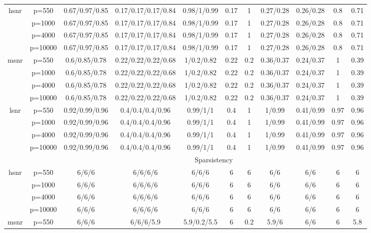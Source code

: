 \begin{table}[ht]
{\begin{tabular}{|c|c|ccccccccc|}
\midrule\multirow{4}[2]{*}{hsnr} & p=550 & 0.67/0.97/0.85 & 0.17/0.17/0.17/0.84 & 0.98/1/0.99 & 0.17 & 1 & 0.27/0.28 & 0.26/0.28 & 0.8 & 0.71 \\ 
   & p=1000 & 0.67/0.97/0.85 & 0.17/0.17/0.17/0.84 & 0.98/1/0.99 & 0.17 & 1 & 0.27/0.28 & 0.26/0.28 & 0.8 & 0.71 \\ 
   & p=4000 & 0.67/0.97/0.85 & 0.17/0.17/0.17/0.84 & 0.98/1/0.99 & 0.17 & 1 & 0.27/0.28 & 0.26/0.28 & 0.8 & 0.71 \\ 
   & p=10000 & 0.67/0.97/0.85 & 0.17/0.17/0.17/0.84 & 0.98/1/0.99 & 0.17 & 1 & 0.27/0.28 & 0.26/0.28 & 0.8 & 0.71 \\ 
  \midrule\multirow{4}[2]{*}{msnr} & p=550 & 0.6/0.85/0.78 & 0.22/0.22/0.22/0.68 & 1/0.2/0.82 & 0.22 & 0.2 & 0.36/0.37 & 0.24/0.37 & 1 & 0.39 \\ 
   & p=1000 & 0.6/0.85/0.78 & 0.22/0.22/0.22/0.68 & 1/0.2/0.82 & 0.22 & 0.2 & 0.36/0.37 & 0.24/0.37 & 1 & 0.39 \\ 
   & p=4000 & 0.6/0.85/0.78 & 0.22/0.22/0.22/0.68 & 1/0.2/0.82 & 0.22 & 0.2 & 0.36/0.37 & 0.24/0.37 & 1 & 0.39 \\ 
   & p=10000 & 0.6/0.85/0.78 & 0.22/0.22/0.22/0.68 & 1/0.2/0.82 & 0.22 & 0.2 & 0.36/0.37 & 0.24/0.37 & 1 & 0.39 \\ 
  \midrule\multirow{4}[2]{*}{lsnr} & p=550 & 0.92/0.99/0.96 & 0.4/0.4/0.4/0.96 & 0.99/1/1 & 0.4 & 1 & 1/0.99 & 0.41/0.99 & 0.97 & 0.96 \\ 
   & p=1000 & 0.92/0.99/0.96 & 0.4/0.4/0.4/0.96 & 0.99/1/1 & 0.4 & 1 & 1/0.99 & 0.41/0.99 & 0.97 & 0.96 \\ 
   & p=4000 & 0.92/0.99/0.96 & 0.4/0.4/0.4/0.96 & 0.99/1/1 & 0.4 & 1 & 1/0.99 & 0.41/0.99 & 0.97 & 0.96 \\ 
   & p=10000 & 0.92/0.99/0.96 & 0.4/0.4/0.4/0.96 & 0.99/1/1 & 0.4 & 1 & 1/0.99 & 0.41/0.99 & 0.97 & 0.96 \\ 
   \midrule 
 \multicolumn{1}{|c}{} &       & \multicolumn{9}{c|}{Sparsistency} \\
\midrule\multirow{4}[2]{*}{hsnr} & p=550 & 6/6/6 & 6/6/6/6 & 6/6/6 & 6 & 6 & 6/6 & 6/6 & 6 & 6 \\ 
   & p=1000 & 6/6/6 & 6/6/6/6 & 6/6/6 & 6 & 6 & 6/6 & 6/6 & 6 & 6 \\ 
   & p=4000 & 6/6/6 & 6/6/6/6 & 6/6/6 & 6 & 6 & 6/6 & 6/6 & 6 & 6 \\ 
   & p=10000 & 6/6/6 & 6/6/6/6 & 6/6/6 & 6 & 6 & 6/6 & 6/6 & 6 & 6 \\ 
  \midrule\multirow{4}[2]{*}{msnr} & p=550 & 6/6/6 & 6/6/6/5.9 & 5.9/0.2/5.5 & 6 & 0.2 & 5.9/6 & 6/6 & 6 & 5.8 \\ 

\end{tabular}}
\end{table}
